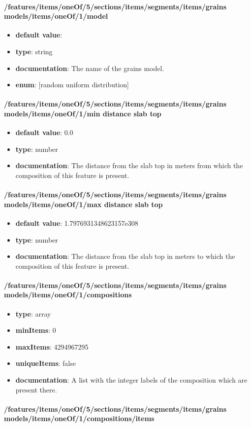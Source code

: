 \paragraph{/features/items/oneOf/5/sections/items/segments/items/grains models/items/oneOf/1/model}
\begin{itemize}\item {\bf default value}: 
\item {\bf type}: string
\item {\bf documentation}: The name of the grains model.
\item {\bf enum}: [random uniform distribution]\end{itemize}\paragraph{/features/items/oneOf/5/sections/items/segments/items/grains models/items/oneOf/1/min distance slab top}
\begin{itemize}\item {\bf default value}: 0.0
\item {\bf type}: number
\item {\bf documentation}: The distance from the slab top in meters from which the composition of this feature is present.
\end{itemize}\paragraph{/features/items/oneOf/5/sections/items/segments/items/grains models/items/oneOf/1/max distance slab top}
\begin{itemize}\item {\bf default value}: 1.7976931348623157e308
\item {\bf type}: number
\item {\bf documentation}: The distance from the slab top in meters to which the composition of this feature is present.
\end{itemize}\paragraph{/features/items/oneOf/5/sections/items/segments/items/grains models/items/oneOf/1/compositions}
\begin{itemize}\item {\bf type}: array
\item {\bf minItems}: 0
\item {\bf maxItems}: 4294967295
\item {\bf uniqueItems}: false
\item {\bf documentation}: A list with the integer labels of the composition which are present there.
\end{itemize}\paragraph{/features/items/oneOf/5/sections/items/segments/items/grains models/items/oneOf/1/compositions/items}
